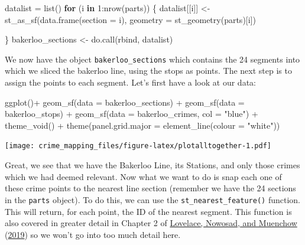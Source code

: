 \documentclass[
  krantz2]{krantz}
\makeatletter
\newenvironment{Shaded}{\begin{snugshade}}{\end{snugshade}}
\newcommand{\AttributeTok}[1]{\textcolor[rgb]{0.61,0.61,0.61}{#1}}
\newcommand{\ControlFlowTok}[1]{\textcolor[rgb]{0.27,0.27,0.27}{\textbf{#1}}}
\newcommand{\DecValTok}[1]{\textcolor[rgb]{0.06,0.06,0.06}{#1}}
\newcommand{\FunctionTok}[1]{\textcolor[rgb]{0,0,0}{#1}}
\newcommand{\NormalTok}[1]{#1}
\newcommand{\OtherTok}[1]{\textcolor[rgb]{0.37,0.37,0.37}{#1}}
\newcommand{\SpecialCharTok}[1]{\textcolor[rgb]{0,0,0}{#1}}
\newcommand{\StringTok}[1]{\textcolor[rgb]{0.5,0.5,0.5}{#1}}
\newenvironment{kframe}{%
\medskip{}
\setlength{\fboxsep}{.8em}
 \def\at@end@of@kframe{}%
 \ifinner\ifhmode%
  \def\at@end@of@kframe{\end{minipage}}%
  \begin{minipage}{\columnwidth}%
 \fi\fi%
 \def\FrameCommand##1{\hskip\@totalleftmargin \hskip-\fboxsep
 \colorbox{shadecolor}{##1}\hskip-\fboxsep
     \hskip-\linewidth \hskip-\@totalleftmargin \hskip\columnwidth}%
 \MakeFramed {\advance\hsize-\width
   \@totalleftmargin\z@ \linewidth\hsize
   \@setminipage}}%
 {\par\unskip\endMakeFramed%
 \at@end@of@kframe}
\renewenvironment{Shaded}{\begin{kframe}}{\end{kframe}}
\makeatother
\begin{document}
\begin{Shaded}
\begin{Highlighting}[]
\NormalTok{datalist }\OtherTok{=} \FunctionTok{list}\NormalTok{()}
\ControlFlowTok{for}\NormalTok{ (i }\ControlFlowTok{in} \DecValTok{1}\SpecialCharTok{:}\FunctionTok{nrow}\NormalTok{(parts)) \{}
\NormalTok{  datalist[[i]] }\OtherTok{\textless{}{-}} \FunctionTok{st\_as\_sf}\NormalTok{(}\FunctionTok{data.frame}\NormalTok{(}\AttributeTok{section =}\NormalTok{ i), }
                            \AttributeTok{geometry =} \FunctionTok{st\_geometry}\NormalTok{(parts)[i])}
  
\NormalTok{\}}
\NormalTok{bakerloo\_sections }\OtherTok{\textless{}{-}} \FunctionTok{do.call}\NormalTok{(rbind, datalist)}
\end{Highlighting}
\end{Shaded}

We now have the object \texttt{bakerloo\_sections} which contains the 24 segments into which we sliced the bakerloo line, using the stops as points. The next step is to assign the points to each segment. Let's first have a look at our data:

\begin{Shaded}
\begin{Highlighting}[]
\FunctionTok{ggplot}\NormalTok{()}\SpecialCharTok{+} 
  \FunctionTok{geom\_sf}\NormalTok{(}\AttributeTok{data =}\NormalTok{ bakerloo\_sections) }\SpecialCharTok{+} 
  \FunctionTok{geom\_sf}\NormalTok{(}\AttributeTok{data =}\NormalTok{ bakerloo\_stops) }\SpecialCharTok{+} 
  \FunctionTok{geom\_sf}\NormalTok{(}\AttributeTok{data =}\NormalTok{ bakerloo\_crimes, }\AttributeTok{col =} \StringTok{"blue"}\NormalTok{) }\SpecialCharTok{+} 
  \FunctionTok{theme\_void}\NormalTok{() }\SpecialCharTok{+} 
  \FunctionTok{theme}\NormalTok{(}\AttributeTok{panel.grid.major =} \FunctionTok{element\_line}\NormalTok{(}\AttributeTok{colour =} \StringTok{"white"}\NormalTok{))}
\end{Highlighting}
\end{Shaded}

\texttt{[image: crime\_mapping\_files/figure-latex/plotalltogether-1.pdf]}

Great, we see that we have the Bakerloo Line, its Stations, and only those crimes which we had deemed relevant. Now what we want to do is snap each one of these crime points to the nearest line section (remember we have the 24 sections in the \texttt{parts} object). To do this, we can use the \texttt{st\_nearest\_feature()} function. This will return, for each point, the ID of the nearest segment. This function is also covered in greater detail in Chapter 2 of \protect\hyperlink{ref-Lovelace_2019}{Lovelace, Nowosad, and Muenchow} (\protect\hyperlink{ref-Lovelace_2019}{2019}) so we won't go into too much detail here.
\end{document}

